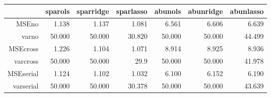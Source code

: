 \begin{table}[ht]
\centering
\begin{tabular}{rrrrrrr}
  \hline
 & sparols & sparridge & sparlasso & abunols & abunridge & abunlasso \\ 
  \hline
MSEno & 1.138 & 1.137 & 1.081 & 6.561 & 6.606 & 6.639 \\ 
  varno & 50.000 & 50.000 & 30.820 & 50.000 & 50.000 & 44.499 \\ 
  MSEcross & 1.226 & 1.104 & 1.071 & 8.914 & 8.925 & 8.936 \\ 
  varcross & 50.000 & 50.000 & 29.9 & 50.000 & 50.000 & 41.978 \\ 
  MSEserial & 1.124 & 1.102 & 1.032 & 6.100 & 6.152 & 6.190 \\ 
  varserial & 50.000 & 50.000 & 30.378 & 50.000 & 50.000 & 43.639 \\ 
   \hline
\end{tabular}
\end{table}
